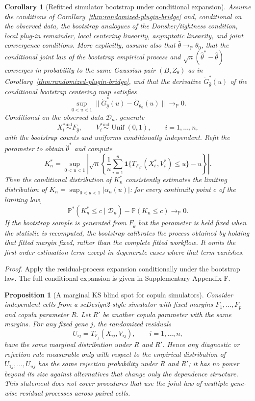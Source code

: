 \documentclass[preprint,12pt]{elsarticle}
\theoremstyle{plain}
\newtheorem{corollary}[theorem]{Corollary}
\newtheorem{proposition}[theorem]{Proposition}
\theoremstyle{remark}
\begin{document}
\begin{corollary}[Refitted simulator bootstrap under conditional expansion]
\label{cor:refitted-bootstrap}
Assume the conditions of Corollary~\ref{thm:randomized-plugin-bridge} and,
conditional on the observed data, the bootstrap analogues of the Donsker/tightness
condition, local plug-in remainder, local centering linearity, asymptotic
linearity, and joint convergence conditions. More explicitly, assume also that
$\widehat\theta\to_{\mathbb P}\theta_0$, that the conditional joint law of the
bootstrap empirical process and
$\sqrt n(\widehat\theta^*-\widehat\theta)$ converges in probability to the same
Gaussian pair $(B,Z_\theta)$ as in
Corollary~\ref{thm:randomized-plugin-bridge}, and that the derivative
$\dot G_{\widehat\theta}^*(u)$ of the conditional bootstrap centering map
satisfies
\[
\sup_{0<u<1}\|\dot G_{\widehat\theta}^*(u)-\dot G_{\theta_0}(u)\|
\to_{\mathbb P}0 .
\]
Conditional on the observed data $\mathcal D_n$, generate
\[
X_i^*\stackrel{\mathrm{ind}}{\sim}F_{\widehat\theta},\qquad
V_i^*\stackrel{\mathrm{ind}}{\sim}\operatorname{Unif}(0,1),
\qquad i=1,\ldots,n,
\]
with the bootstrap counts and uniforms conditionally independent. Refit the
parameter to obtain $\widehat\theta^*$ and compute
\[
K_n^*=\sup_{0<u<1}
\left|
\sqrt n\left\{\frac{1}{n}\sum_{i=1}^n
\mathbf 1\{T_{F_{\widehat\theta^*}}(X_i^*,V_i^*)\le u\}-u\right\}
\right|.
\]
Then the conditional distribution of $K_n^*$ consistently estimates the
limiting distribution of $K_n=\sup_{0<u<1}|\alpha_n(u)|$: for every continuity
point $c$ of the limiting law,
\[
\mathbb P^*(K_n^*\le c\mid\mathcal D_n)
-
\mathbb P(K_n\le c)
\to_{\mathbb P}0 .
\]
If the bootstrap sample is generated from $F_{\widehat\theta}$ but the
parameter is held fixed when the statistic is recomputed, the bootstrap
calibrates the process obtained by holding that fitted margin fixed, rather
than the complete fitted workflow. It omits the first-order estimation term except in degenerate
cases where that term vanishes.
\end{corollary}

\noindent\textit{Proof.} Apply the residual-process expansion conditionally
under the bootstrap law. The full conditional expansion is given in
Supplementary Appendix F.

\begin{proposition}[A marginal KS blind spot for copula simulators]
\label{prop:copula-blind-spot}
Consider independent cells from a scDesign2-style simulator with fixed margins
$F_1,\ldots,F_p$ and copula parameter $R$. Let $R'$ be another copula
parameter with the same margins. For any fixed gene $j$, the randomized
residuals
\[
U_{ij}=T_{F_j}(X_{ij},V_{ij}),\qquad i=1,\ldots,n,
\]
have the same marginal distribution under $R$ and $R'$. Hence any diagnostic
or rejection rule measurable only with respect to the empirical distribution of
$U_{1j},\ldots,U_{nj}$ has the same rejection probability under $R$ and $R'$;
it has no power beyond its size against alternatives that change only the
dependence structure. This statement does not cover procedures that use the
joint law of multiple gene-wise residual processes across paired cells.
\end{proposition}
\end{document}
